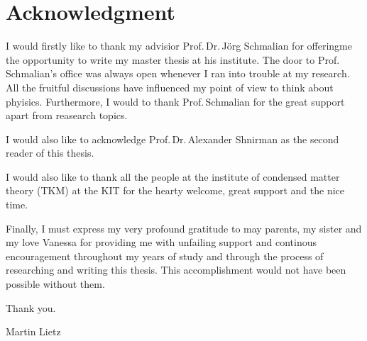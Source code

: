 %
%
\chapter*{Acknowledgment}
%
%
I would firstly like to thank my advisior Prof.\,Dr.\,J\"org Schmalian for offeringme the opportunity to write my master thesis at his institute.
The door to Prof.\,Schmalian's office was always open whenever I ran into trouble at my research.
All the fruitful discussions have influenced my point of view to think about phyisics.
Furthermore, I would to thank Prof.\,Schmalian for the great support apart from reasearch topics.

\vspace{1em}
\noindent I would also like to acknowledge Prof.\,Dr.\,Alexander Shnirman as the second reader of this thesis.

\vspace{1em}
\noindent I would also like to thank all the people at the institute of condensed matter theory (TKM) at the KIT for the hearty welcome, great support and the nice time.

\vspace{1em}
\noindent Finally, I must express my very profound gratitude to may parents, my sister and my love Vanessa for providing me with unfailing support and continous encouragement throughout my years  of study and through the process of researching and writing this thesis.
This accomplishment would not have been possible without them. 

\vspace{2em}
\noindent Thank you.

\vspace{1em}
\noindent Martin Lietz